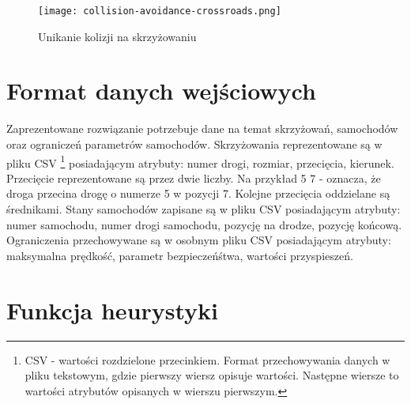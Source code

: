 \begin{figure}[H]
    \texttt{[image: collision-avoidance-crossroads.png]}
  \caption{Unikanie kolizji na skrzyżowaniu}
  \label{collision-avoidance-crossroads}
\end{figure}
\newpage

\section{Format danych wejściowych}

Zaprezentowane rozwiązanie potrzebuje dane na temat skrzyżowań, samochodów oraz ograniczeń parametrów samochodów. Skrzyżowania reprezentowane są w pliku CSV \footnote{CSV - wartości rozdzielone przecinkiem. Format przechowywania danych w pliku tekstowym, gdzie pierwszy wiersz opisuje wartości. Następne wiersze to wartości atrybutów opisanych w wierszu pierwszym. } posiadającym atrybuty: numer drogi, rozmiar, przecięcia, kierunek. Przecięcie reprezentowane są przez dwie liczby. Na przykład 5 7 - oznacza, że droga przecina drogę o numerze 5 w pozycji 7. Kolejne przecięcia oddzielane są średnikami. Stany samochodów zapisane są w pliku CSV posiadającym atrybuty: numer samochodu, numer drogi samochodu, pozycję na drodze, pozycję końcową. Ograniczenia przechowywane są w osobnym pliku CSV posiadającym atrybuty: maksymalna prędkość, parametr bezpieczeńśtwa, wartości przyspieszeń.

\section{Funkcja heurystyki}

